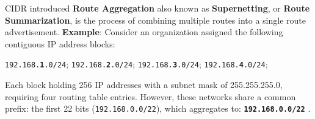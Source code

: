 \begin{Def}

    CIDR introduced \textbf{Route Aggregation} also known as \textbf{Supernetting}, or \textbf{Route Summarization}, is the process of combining multiple routes into a single route advertisement.
    \textbf{Example}:
    Consider an organization assigned the following contiguous IP address blocks:
    \begin{center}
        \texttt{192.168.\textbf{1}.0/24}; \quad \texttt{192.168.\textbf{2}.0/24}; \quad \texttt{192.168.\textbf{3}.0/24}; \quad \texttt{192.168.\textbf{4}.0/24};
    \end{center}
    Each block holding 256 IP addresses with a subnet mask of 255.255.255.0, requiring four routing table entries. 
    However, these networks share a common prefix: the first 22 bits (\texttt{192.168.0.0/22}), which aggregates to: \texttt{\textbf{192.168.0.0/22}} \cite{fuller_cidr_rfc1519}.

\end{Def}
\newpage
